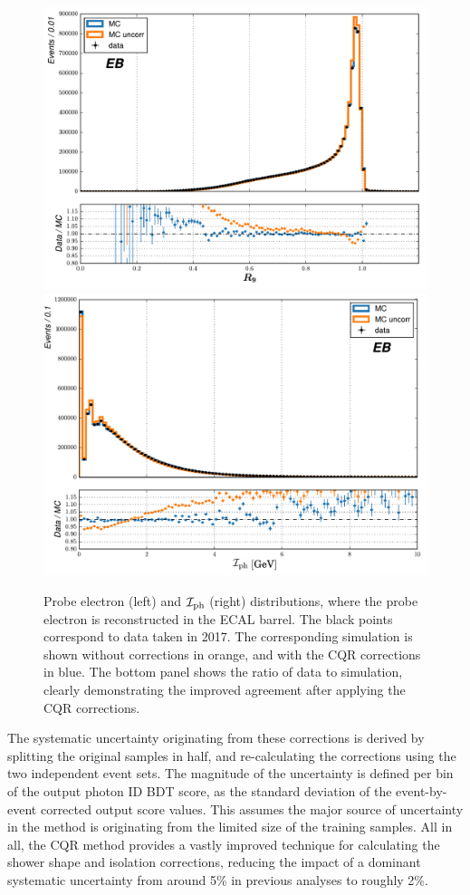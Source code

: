 \begin{figure}[hptb]
  \centering
  \includegraphics[width=.49\textwidth]{Figures/hgg_overview/dataMC_probeR9_0_corr.pdf}
  \includegraphics[width=.49\textwidth]{Figures/hgg_overview/dataMC_probePhoIso_0_corr.pdf}
  \caption[Corrections from the chained quantile regression method for \RNINE and $\mathcal{I}_{\rm{ph}}$]
  {
    Probe electron \RNINE (left) and $\mathcal{I}_{\rm{ph}}$ (right) distributions, where the probe electron is reconstructed in the ECAL barrel. The black points correspond to data taken in 2017. The corresponding simulation is shown without corrections in orange, and with the CQR corrections in blue. The bottom panel shows the ratio of data to simulation, clearly demonstrating the improved agreement after applying the CQR corrections.
  }
  \label{fig:photon_id_0}
\end{figure}

The systematic uncertainty originating from these corrections is derived by splitting the original \Zee samples in half, and re-calculating the corrections using the two independent event sets. The magnitude of the uncertainty is defined per bin of the output photon ID BDT score, as the standard deviation of the event-by-event corrected output score values. This assumes the major source of uncertainty in the method is originating from the limited size of the training samples. All in all, the CQR method provides a vastly improved technique for calculating the shower shape and isolation corrections, reducing the impact of a dominant systematic uncertainty from around 5\% in previous \Hgg analyses to roughly 2\%.

